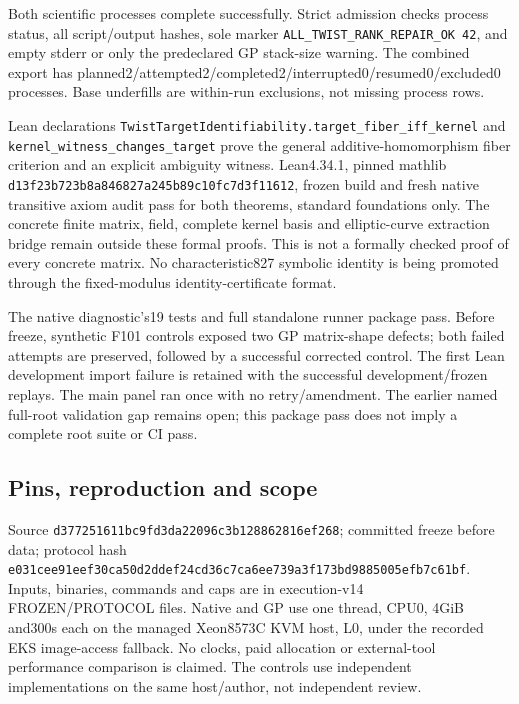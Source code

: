 \documentclass[
  10pt,
]{article}
\begin{document}
Both scientific processes complete successfully. Strict admission checks
process status, all script/output hashes, sole marker
\texttt{ALL\_TWIST\_RANK\_REPAIR\_OK\ 42}, and empty stderr or only the
predeclared GP stack-size warning. The combined export has
planned2/attempted2/completed2/interrupted0/resumed0/excluded0
processes. Base underfills are within-run exclusions, not missing
process rows.

Lean declarations
\texttt{TwistTargetIdentifiability.target\_fiber\_iff\_kernel} and
\texttt{kernel\_witness\_changes\_target} prove the general
additive-homomorphism fiber criterion and an explicit ambiguity witness.
Lean4.34.1, pinned mathlib
\texttt{d13f23b7\allowbreak{}23b8a846\allowbreak{}827a245b\allowbreak{}89c10fc7\allowbreak{}d3f11612}, frozen build and
fresh native transitive axiom audit pass for both theorems, standard
foundations only. The concrete finite matrix, field, complete kernel
basis and elliptic-curve extraction bridge remain outside these formal
proofs. This is not a formally checked proof of every concrete matrix.
No characteristic827 symbolic identity is being promoted through the
fixed-modulus identity-certificate format.

The native diagnostic's19 tests and full standalone runner package pass.
Before freeze, synthetic F101 controls exposed two GP matrix-shape
defects; both failed attempts are preserved, followed by a successful
corrected control. The first Lean development import failure is retained
with the successful development/frozen replays. The main panel ran once
with no retry/amendment. The earlier named full-root validation gap
remains open; this package pass does not imply a complete root suite or
CI pass.

\subsection{Pins, reproduction and
scope}\label{pins-reproduction-and-scope}

Source \texttt{d3772516\allowbreak{}11bc9fd3\allowbreak{}da22096c\allowbreak{}3b128862\allowbreak{}816ef268}; committed
freeze before data; protocol hash
\texttt{e031cee9\allowbreak{}1eef30ca\allowbreak{}50d2ddef\allowbreak{}24cd36c7\allowbreak{}ca6ee739\allowbreak{}a3f173bd\allowbreak{}9885005e\allowbreak{}fb7c61bf}.
Inputs, binaries, commands and caps are in execution-v14 FROZEN/PROTOCOL
files. Native and GP use one thread, CPU0, 4GiB and300s each on the
managed Xeon8573C KVM host, L0, under the recorded EKS image-access
fallback. No clocks, paid allocation or external-tool performance
comparison is claimed. The controls use independent implementations on
the same host/author, not independent review.
\end{document}
